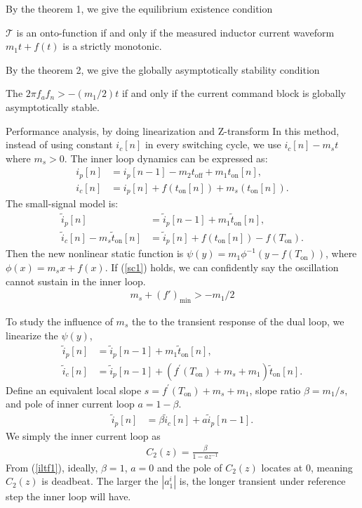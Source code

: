 By the theorem 1, we give the equilibrium existence condition 
\begin{corollary}
$\mathcal{T}$ is an onto-function if and only if the measured inductor current waveform $m_1t+f(t)$ is a strictly monotonic.
\end{corollary}
By the theorem 2, we give the globally asymptotically stability condition 
\begin{corollary}
The $2 \pi f_a f_n > -(m_1/2) t$ if and only if the current command block is globally asymptotically stable.
\end{corollary} 
Performance analysis, by doing linearization and Z-transform
In this method, instead of using constant $i_c[n]$ in every switching cycle, we use $i_c[n] - m_s t$ where $m_s>0$. The inner loop dynamics can be expressed as:
\begin{align}
i_p[n] &= i_p[n-1] - m_2t_{\text{off}} +m_1t_{\text{on}}[n], \\
i_c [n]  &= i_p[n] +f(t_{\text{on}}[n]) + m_s (t_{\text{on}}[n]).
\end{align}
The small-signal model is:
\begin{align}
\tilde i_p[n] &= \tilde i_p[n-1] +  m_1 \tilde t_{\text{on}}[n], \\
\tilde i_c [n] - m_s \tilde t_{\text{on}} [n] & = \tilde i_p[n] + f(t_{\text{on}}[n]) - f(T_{\text{on}}).
\end{align}
Then the new nonlinear static function is $\psi(y) = m_1 \phi ^{-1}(y-f(T_{\text{on}}))$, where $\phi(x) = m_s x + f(x)$. If (\ref{sc1}) holds, we can confidently say the oscillation cannot sustain in the inner loop. 
\begin{align} \label{sc1}
m_s + (f')_{\text{min}} > -m_1/2
\end{align}


To study the influence of $m_s$ the to the transient response of the dual loop, we linearize the $\psi(y)$,
\begin{align} 
\tilde i_p[n] &= \tilde i_p[n-1] +  m_1 \tilde t_{\text{on}}[n], \\
\tilde i_c [n]  & = \tilde i_p[n-1] + (f^{'}(T_{\text{on}}) +m_s+m_1)\tilde t_{\text{on}} [n].
\end{align}
Define an equivalent local slope $s = f^{'}(T_{\text{on}}) +m_s+m_1$, slope ratio $\beta = m_1/s$, and pole of inner current loop $a = 1-\beta$.
\begin{align}
\tilde i_p[n] &=  \beta \tilde i_c [n] + a \tilde i_p[n-1].
\end{align}
We simply the inner current loop as 
\begin{align} \label{iltf1}
C_2(z) = \frac{\beta }{1-a z^{-1}}
\end{align}
From (\ref{iltf1}), ideally, $\beta = 1$, $a = 0$ and the pole of $C_2(z)$ locates at 0, meaning $C_2(z)$ is deadbeat. 
The larger the $|a^{i}_1|$ is, the longer transient under reference step the inner loop will have.

